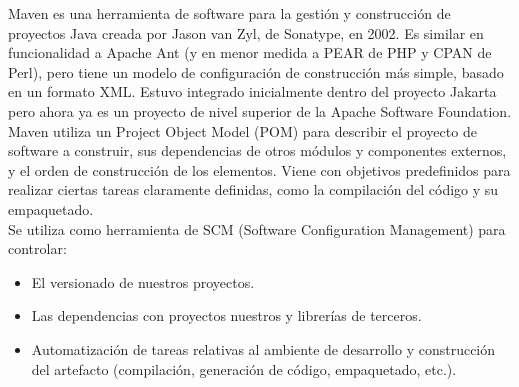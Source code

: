 Maven es una herramienta de software para la gestión y construcción de proyectos
Java creada por Jason van Zyl, de Sonatype, en 2002. Es similar en funcionalidad
a Apache Ant (y en menor medida a PEAR de PHP y CPAN de Perl), pero tiene un
modelo de configuración de construcción más simple, basado en un formato XML.
Estuvo integrado inicialmente dentro del proyecto Jakarta pero ahora ya es un
proyecto de nivel superior de la Apache Software Foundation.\\

Maven utiliza un Project Object Model (POM) para describir el proyecto de
software a construir, sus dependencias de otros módulos y componentes externos,
y el orden de construcción de los elementos. Viene con objetivos predefinidos
para realizar ciertas tareas claramente definidas, como la compilación del
código y su empaquetado.\\

Se utiliza como herramienta de SCM (Software Configuration Management) para
controlar:
\begin{itemize}    
	\item El versionado de nuestros proyectos.
	\item Las dependencias con proyectos nuestros y librerías de terceros.     
	\item Automatización de tareas relativas al ambiente de desarrollo y 
	construcción del artefacto (compilación, generación de código, empaquetado, 
	etc.). 
\end{itemize}